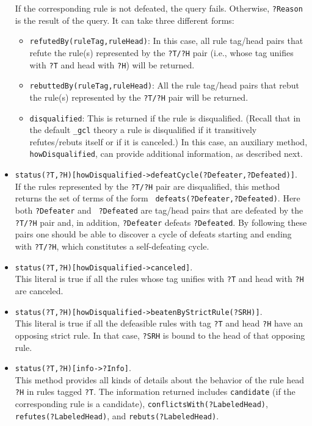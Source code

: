 \documentclass[11pt]{article}
\begin{document}
\begin{itemize}
  If the corresponding rule is not defeated, the query fails.  Otherwise,
  {\tt ?Reason} is the result of the query. It can take three different forms:
  \begin{itemize}
  \item {\tt refutedBy(ruleTag,ruleHead)}: In this case, all rule
    tag/head pairs that refute the rule(s) represented by the {\tt ?T/?H}
    pair (i.e., whose tag unifies with {\tt ?T} and head with {\tt ?H})
    will be returned.
  \item {\tt rebuttedBy(ruleTag,ruleHead)}: All the rule
    tag/head pairs that rebut the rule(s) represented by the {\tt ?T/?H} pair
    will be returned.
  \item {\tt disqualified}: This is returned if the rule is
    disqualified. (Recall that in the default {\tt \_gcl} theory a rule is
    disqualified if it transitively refutes/rebuts itself or if it is
    canceled.)
    In this case, an auxiliary method, {\tt howDisqualified}, can provide
    additional information, as described next. 
  \end{itemize}
\item  {\tt status(?T,?H)[howDisqualified->defeatCycle(?Defeater,?Defeated)]}.\\
  If the rules represented by the {\tt ?T/?H} pair are disqualified, this
  method returns the set of terms of the form {\tt
    defeats(?Defeater,?Defeated)}. Here both {\tt ?Defeater} and {\tt
    ?Defeated} are tag/head pairs that are defeated by the {\tt ?T/?H} pair
  and, in addition, {\tt ?Defeater} defeats {\tt ?Defeated}. By following
  these pairs one should be able
  to discover a cycle of defeats starting and ending
  with {\tt ?T/?H}, which constitutes a self-defeating cycle.
\item  {\tt status(?T,?H)[howDisqualified->canceled]}.\\
  This literal is true if all the rules whose tag unifies with
  {\tt ?T} and head with {\tt ?H} are
  canceled.
\item  {\tt status(?T,?H)[howDisqualified->beatenByStrictRule(?SRH)]}.\\
  This literal is true if all the defeasible rules with tag \texttt{?T}
  and head \texttt{?H} have an opposing strict rule. In that case,
  \texttt{?SRH} is bound to the head of that opposing rule. 
\item  {\tt status(?T,?H)[info->?Info]}.\\
  This method provides all kinds of details about the behavior of the rule
  head {\tt ?H} in rules tagged {\tt ?T}. The information returned
  includes {\tt candidate} (if the corresponding rule is a candidate),
  {\tt conflictsWith(?LabeledHead)}, {\tt refutes(?LabeledHead)}, and
  {\tt rebuts(?LabeledHead)}.   
\end{itemize}
\end{document}
